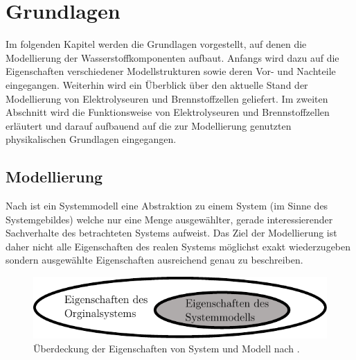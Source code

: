 \chapter{Grundlagen}
\label{cha:Grundlagen}
Im folgenden Kapitel werden die Grundlagen vorgestellt, auf denen die Modellierung der Wasserstoffkomponenten aufbaut. Anfangs wird dazu auf die Eigenschaften verschiedener Modellstrukturen sowie deren Vor- und Nachteile eingegangen. Weiterhin wird ein Überblick über den aktuelle Stand der Modellierung von Elektrolyseuren und Brennstoffzellen geliefert. Im zweiten Abschnitt wird die Funktionsweise von Elektrolyseuren und Brennstoffzellen erläutert und darauf aufbauend auf die zur Modellierung genutzten physikalischen Grundlagen eingegangen.\\ 

\section{Modellierung}
Nach \citet[S.~32]{tabeling_softwaresysteme_2006} ist ein Systemmodell eine Abstraktion zu einem System (im Sinne des Systemgebildes) welche nur eine Menge ausgewählter, gerade interessierender Sachverhalte des betrachteten Systems aufweist. Das Ziel der Modellierung ist daher nicht alle Eigenschaften des realen Systems möglichst exakt wiederzugeben sondern ausgewählte Eigenschaften ausreichend genau zu beschreiben.\\

\begin{figure}[h]
	\centering
		\includegraphics[scale=1]{Figures/Modell-System.pdf}
		\caption{Überdeckung der Eigenschaften von System und Modell nach \citet{tabeling_softwaresysteme_2006}.}
\label{fig:Modell-System}	
\end{figure}

